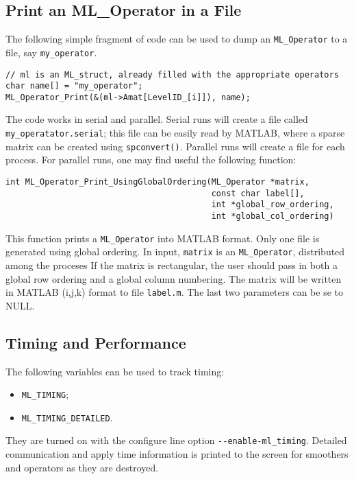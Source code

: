\documentclass[10pt,letter,relax]{SANDreport}
\begin{document}
\subsection{Print an ML\_Operator in a File}

The following simple fragment of code can be used to dump an
\verb!ML_Operator! to a file, say \verb!my_operator!.
\begin{verbatim}
// ml is an ML_struct, already filled with the appropriate operators
char name[] = "my_operator";
ML_Operator_Print(&(ml->Amat[LevelID_[i]]), name);
\end{verbatim}
The code works in serial and parallel. Serial runs will create a file called
\verb!my_operatator.serial!; this file can be easily read by MATLAB, where a
sparse matrix can be created using \verb!spconvert()!. Parallel runs will
create a file for each process. For parallel runs, one may find useful the
following function:
\begin{verbatim}
int ML_Operator_Print_UsingGlobalOrdering(ML_Operator *matrix,
                                          const char label[],
                                          int *global_row_ordering,
                                          int *global_col_ordering)
\end{verbatim}
This function prints a \verb!ML_Operator! into MATLAB format. Only one file is generated using global ordering. 
In input, \verb!matrix! is an \verb!ML_Operator!, distributed among the proceses     
If the matrix is rectangular, the user should   pass in both a global row
ordering and a global column numbering. The
matrix will be written in MATLAB (i,j,k) format to file \verb!label.m!. The
last two parameters can be se to NULL.

\subsection{Timing and Performance}

The following variables can be used to track timing:
\begin{itemize}
\item \verb!ML_TIMING!;
\item \verb!ML_TIMING_DETAILED!.
\end{itemize}
They are turned on with the configure line option \verb!--enable-ml_timing!.
Detailed communication and apply time information is printed to the screen for smoothers
and operators as they are destroyed.
\end{document}
